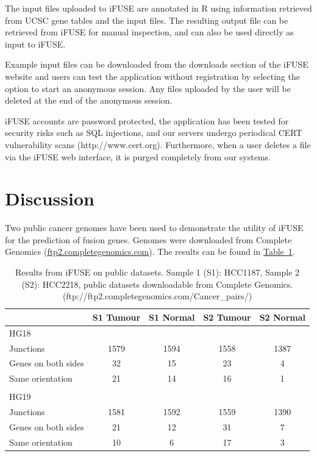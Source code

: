 The input files uploaded to iFUSE are annotated in R using information retrieved from UCSC gene tables and the input files. The resulting output file can be retrieved from iFUSE for manual inspection, and can also be used directly as input to iFUSE.

Example input files can be downloaded from the downloads section of the iFUSE website and users can test the application without registration by selecting the option to start an anonymous session. Any files uploaded by the user will be deleted at the end of the anonymous session.\

iFUSE accounts are password protected, the application has been tested for security risks such as SQL injections, and our servers undergo periodical CERT vulnerability scans (http://www.cert.org). Furthermore, when a user deletes a file via the iFUSE web interface, it is purged completely from our systems.

\section*{Discussion}


Two public cancer genomes have been used to demonstrate the utility of iFUSE for the prediction of fusion genes. Genomes were downloaded from Complete Genomics (\href{ftp2.completegenomics.com}{ftp2.completegenomics.com}). The results can be found in \hyperref[tab:results]{Table~\ref*{tab:results}}.


\begin{table}[!t]
    \begin{tabular}{lcccc}
        \toprule
                              & S1 Tumour  & S1 Normal  & S2 Tumour   & S2 Normal \\
        \midrule
        HG18                  &            &            &             &         \\
        Junctions             & 1579       & 1594       & 1558        & 1387    \\
        Genes on both sides   & 32         & 15         & 23          & 4       \\
        Same orientation      & 21         & 14         & 16          & 1       \\
                              &            &            &             &         \\
        HG19                  &            &            &             &         \\
        Junctions             & 1581       & 1592       & 1559        & 1390    \\
        Genes on both sides   & 21         & 12         & 31          & 7       \\
        Same orientation      & 10         & 6          & 17          & 3       \\
        \toprule
    \end{tabular}
    \caption{Results from iFUSE on public datasets. Sample 1 (S1): HCC1187, Sample 2 (S2): HCC2218, public datasets downloadable from Complete Genomics. (ftp://ftp2.completegenomics.com/Cancer\_pairs/)
    }
    \label{tab:results}
\end{table}

